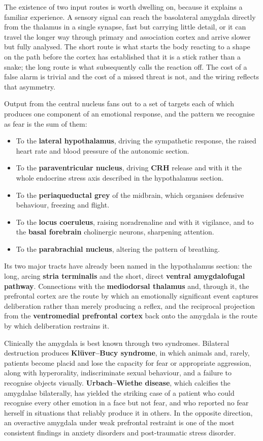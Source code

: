 \documentclass[11pt]{article}
\begin{document}
The existence of two input routes is worth dwelling on, because it explains a familiar experience. A sensory signal can reach the basolateral amygdala directly from the thalamus in a single synapse, fast but carrying little detail, or it can travel the longer way through primary and association cortex and arrive slower but fully analysed. The short route is what starts the body reacting to a shape on the path before the cortex has established that it is a stick rather than a snake; the long route is what subsequently calls the reaction off. The cost of a false alarm is trivial and the cost of a missed threat is not, and the wiring reflects that asymmetry.

Output from the central nucleus fans out to a set of targets each of which produces one component of an emotional response, and the pattern we recognise as fear is the sum of them:

\begin{itemize}
    \item To the \textbf{lateral hypothalamus}, driving the sympathetic response, the raised heart rate and blood pressure of the autonomic section.
    \item To the \textbf{paraventricular nucleus}, driving \textbf{CRH} release and with it the whole endocrine stress axis described in the hypothalamus section.
    \item To the \textbf{periaqueductal grey} of the midbrain, which organises defensive behaviour, freezing and flight.
    \item To the \textbf{locus coeruleus}, raising noradrenaline and with it vigilance, and to the \textbf{basal forebrain} cholinergic neurons, sharpening attention.
    \item To the \textbf{parabrachial nucleus}, altering the pattern of breathing.
\end{itemize}

Its two major tracts have already been named in the hypothalamus section: the long, arcing \textbf{stria terminalis} and the short, direct \textbf{ventral amygdalofugal pathway}. Connections with the \textbf{mediodorsal thalamus} and, through it, the prefrontal cortex are the route by which an emotionally significant event captures deliberation rather than merely producing a reflex, and the reciprocal projection from the \textbf{ventromedial prefrontal cortex} back onto the amygdala is the route by which deliberation restrains it.

Clinically the amygdala is best known through two syndromes. Bilateral destruction produces \textbf{Kl\"uver--Bucy syndrome}, in which animals and, rarely, patients become placid and lose the capacity for fear or appropriate aggression, along with hyperorality, indiscriminate sexual behaviour, and a failure to recognise objects visually. \textbf{Urbach--Wiethe disease}, which calcifies the amygdalae bilaterally, has yielded the striking case of a patient who could recognise every other emotion in a face but not fear, and who reported no fear herself in situations that reliably produce it in others. In the opposite direction, an overactive amygdala under weak prefrontal restraint is one of the most consistent findings in anxiety disorders and post-traumatic stress disorder.
\end{document}
